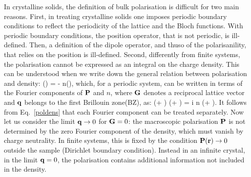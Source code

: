 In crystalline solids, the definition of bulk polarisation is difficult for two main reasons.
First, in treating crystalline solids one imposes periodic boundary conditions to reflect the periodicity of the lattice and the Bloch functions. With periodic boundary conditions, the position operator, that is not periodic, is ill-defined. Then, a definition of the dipole operator, and thuso of the polarisanility,  that relies on the position is ill-defined.%
 Second, differently from finite systems, the polarisation cannot be expressed as an integral on the charge density\cite{Martin1998}.
This can be understood when we write down the general relation between polarisation and density:
\be
\nabla \cdot \PP(\rr) = - n(\rr),
\ee                              
which, for a periodic system, can be written in terms of the Fourier components of ${\bf P}$ and $n$, where ${\bf G}$ denotes a reciprocal lattice vector and ${\bf q}$ belongs to the first Brillouin zone(BZ), as:
\be
(\qq + \GG) \cdot \PP(\qq + \GG) = i n (\qq + \GG).
\label{poldens}
\ee
It follows from Eq.~\ref{poldens} that each Fourier component can be treated separately. Now let us consider the limit ${\bf q} \rightarrow 0$ for ${\bf G}=0$: the macroscopic polarisation ${\bf P}$ is not determined by the zero Fourier component of the density, which must vanish by charge neutrality. In finite systems, this  is fixed by the condition  ${\bf P}({\bf r}) \rightarrow 0 $ outside the sample (Dirichlet boundary condition). Instead in an infinite crystal, in the limit ${\bf q} = 0$, the polarisation contains additional information not included in the density.\cite{Martin1998} 
